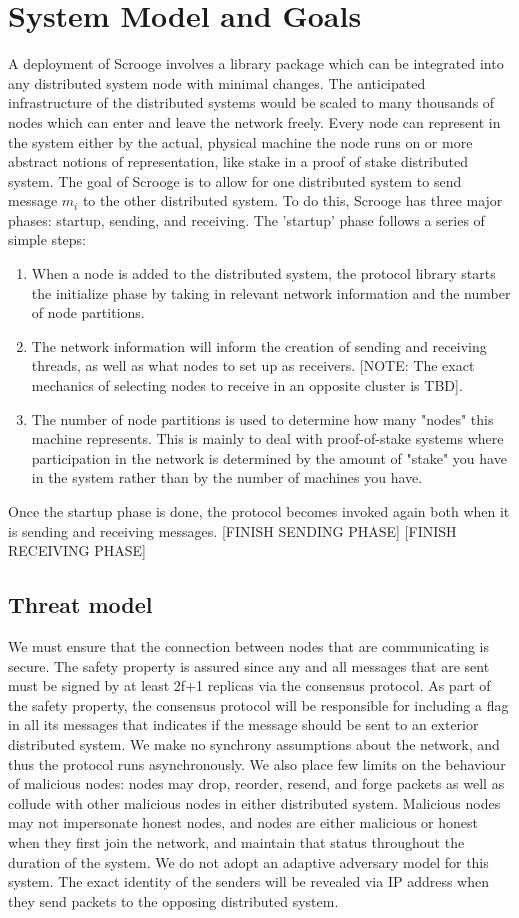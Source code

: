 \section{System Model and Goals}
A deployment of Scrooge involves a library package which can be integrated into any distributed system node with minimal changes. The anticipated infrastructure of the distributed systems would be scaled to many thousands of nodes which can enter and leave the network freely. Every node can represent in the system either by the actual, physical machine the node runs on or more abstract notions of representation, like stake in a proof of stake distributed system. The goal of Scrooge is to allow for one distributed system to send message $m_i$ to the other distributed system. To do this, Scrooge has three major phases: startup, sending, and receiving. The 'startup' phase follows a series of simple steps:
\begin{enumerate}
    \item When a node is added to the distributed system, the protocol library starts the initialize phase by taking in relevant network information and the number of node partitions.
	\item The network information will inform the creation of sending and receiving threads, as well as what nodes to set up as receivers. [NOTE: The exact mechanics of selecting nodes to receive in an opposite cluster is TBD].
	\item The number of node partitions is used to determine how many "nodes" this machine represents. This is mainly to deal with proof-of-stake systems where participation in the network is determined by the amount of "stake" you have in the system rather than by the number of machines you have.
\end{enumerate}
Once the startup phase is done, the protocol becomes invoked again both when it is sending and receiving messages. 
[FINISH SENDING PHASE]
[FINISH RECEIVING PHASE]

\subsection{Threat model}
We must ensure that the connection between nodes that are communicating is secure. The safety property is assured since any and all messages that are sent must be signed by at least 2f+1 replicas via the consensus protocol. As part of the safety property, the consensus protocol will be responsible for including a flag in all its messages that indicates if the message should be sent to an exterior distributed system. We make no synchrony assumptions about the network, and thus the protocol runs asynchronously. We also place few limits on the behaviour of malicious nodes: nodes may drop, reorder, resend, and forge packets as well as collude with other malicious nodes in either distributed system. Malicious nodes may not impersonate honest nodes, and nodes are either malicious or honest when they first join the network, and maintain that status throughout the duration of the system. We do not adopt an adaptive adversary model for this system. The exact identity of the senders will be revealed via IP address when they send packets to the opposing distributed system. 

